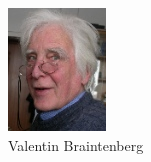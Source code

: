 \documentclass{article}
\begin{document}
\begin{center}
\begin{figure}[H]
\begin{minipage}[H]{0.25\linewidth}
	\includegraphics[width=\textwidth]{../ressources/valentin_braitenberg}
	\caption{Valentin Braintenberg}
\end{minipage}
\hfill
\begin{minipage}[H]{0.25\linewidth}
	\centering

\end{minipage}
\end{figure}
\end{center}
\end{document}
